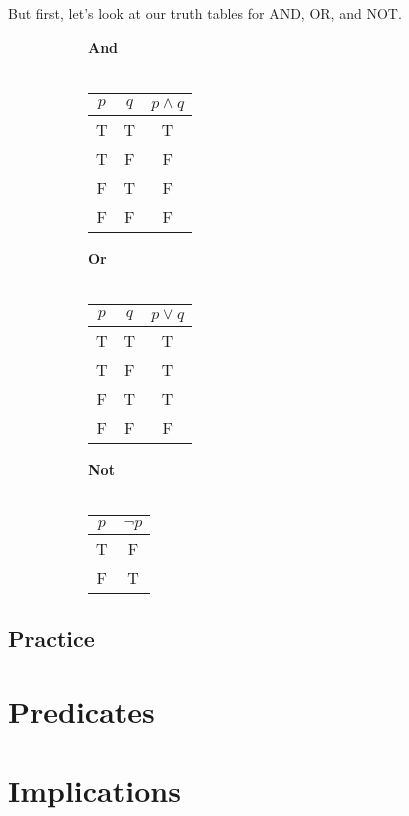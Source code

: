 \documentclass[../RachelNotes.tex]{subfiles}
\begin{document}
        But first, let's look at our truth tables for AND, OR, and NOT.

\begin{figure}[h]
\centering
\begin{subfigure}{.3\textwidth}
\centering

\textbf{And} ~\\ ~\\

\begin{tabular}{ c c | c }
    $p$ & $q$ & $p \land q$
    \\ \hline
    T & T & T \\
    T & F & F \\
    F & T & F \\
    F & F & F
\end{tabular}

\end{subfigure}%
\begin{subfigure}{.3\textwidth}
\centering

\textbf{Or} ~\\ ~\\

\begin{tabular}{ c c | c }
    $p$ & $q$ & $p \lor q$
    \\ \hline
    T & T & T \\
    T & F & T \\
    F & T & T \\
    F & F & F
\end{tabular}
    
\end{subfigure}%
\begin{subfigure}{.3\textwidth}
\centering

\textbf{Not} ~\\ ~\\

\begin{tabular}{ c | c }
    $p$ & $\neg p$
    \\ \hline
    T & F \\
    F & T
\end{tabular}
    
\end{subfigure}
\end{figure}


    \hrulefill
    \subsection{Practice}
        
        

    
    \newpage
    \section{Predicates}

    \section{Implications}
\end{document}
